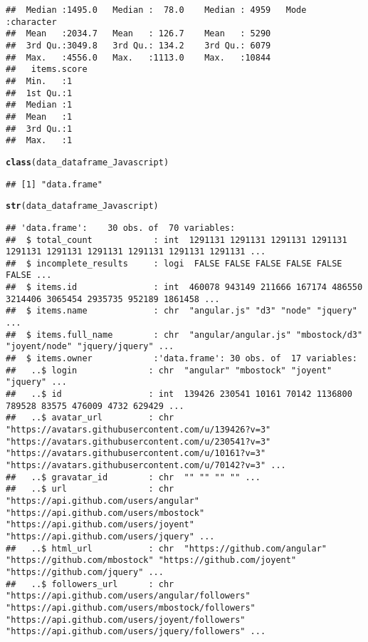\documentclass{article}\usepackage[]{graphicx}\usepackage[]{color}
\makeatletter
\newcommand{\hlstd}[1]{\textcolor[rgb]{0.345,0.345,0.345}{#1}}%
\newcommand{\hlkwd}[1]{\textcolor[rgb]{0.737,0.353,0.396}{\textbf{#1}}}%
\newenvironment{kframe}{%
 \def\at@end@of@kframe{}%
 \ifinner\ifhmode%
  \def\at@end@of@kframe{\end{minipage}}%
  \begin{minipage}{\columnwidth}%
 \fi\fi%
 \def\FrameCommand##1{\hskip\@totalleftmargin \hskip-\fboxsep
 \colorbox{shadecolor}{##1}\hskip-\fboxsep
     \hskip-\linewidth \hskip-\@totalleftmargin \hskip\columnwidth}%
 \MakeFramed {\advance\hsize-\width
   \@totalleftmargin\z@ \linewidth\hsize
   \@setminipage}}%
 {\par\unskip\endMakeFramed%
 \at@end@of@kframe}
\newenvironment{knitrout}{}{} %
\makeatother
\begin{document}
\begin{knitrout}
\begin{kframe}
\begin{verbatim}
##  Median :1495.0   Median :  78.0    Median : 4959   Mode  :character    
##  Mean   :2034.7   Mean   : 126.7    Mean   : 5290                       
##  3rd Qu.:3049.8   3rd Qu.: 134.2    3rd Qu.: 6079                       
##  Max.   :4556.0   Max.   :1113.0    Max.   :10844                       
##   items.score
##  Min.   :1   
##  1st Qu.:1   
##  Median :1   
##  Mean   :1   
##  3rd Qu.:1   
##  Max.   :1
\end{verbatim}
\begin{alltt}
\hlkwd{class}\hlstd{(data_dataframe_Javascript)}
\end{alltt}
\begin{verbatim}
## [1] "data.frame"
\end{verbatim}
\begin{alltt}
\hlkwd{str}\hlstd{(data_dataframe_Javascript)}
\end{alltt}
\begin{verbatim}
## 'data.frame':	30 obs. of  70 variables:
##  $ total_count            : int  1291131 1291131 1291131 1291131 1291131 1291131 1291131 1291131 1291131 1291131 ...
##  $ incomplete_results     : logi  FALSE FALSE FALSE FALSE FALSE FALSE ...
##  $ items.id               : int  460078 943149 211666 167174 486550 3214406 3065454 2935735 952189 1861458 ...
##  $ items.name             : chr  "angular.js" "d3" "node" "jquery" ...
##  $ items.full_name        : chr  "angular/angular.js" "mbostock/d3" "joyent/node" "jquery/jquery" ...
##  $ items.owner            :'data.frame':	30 obs. of  17 variables:
##   ..$ login              : chr  "angular" "mbostock" "joyent" "jquery" ...
##   ..$ id                 : int  139426 230541 10161 70142 1136800 789528 83575 476009 4732 629429 ...
##   ..$ avatar_url         : chr  "https://avatars.githubusercontent.com/u/139426?v=3" "https://avatars.githubusercontent.com/u/230541?v=3" "https://avatars.githubusercontent.com/u/10161?v=3" "https://avatars.githubusercontent.com/u/70142?v=3" ...
##   ..$ gravatar_id        : chr  "" "" "" "" ...
##   ..$ url                : chr  "https://api.github.com/users/angular" "https://api.github.com/users/mbostock" "https://api.github.com/users/joyent" "https://api.github.com/users/jquery" ...
##   ..$ html_url           : chr  "https://github.com/angular" "https://github.com/mbostock" "https://github.com/joyent" "https://github.com/jquery" ...
##   ..$ followers_url      : chr  "https://api.github.com/users/angular/followers" "https://api.github.com/users/mbostock/followers" "https://api.github.com/users/joyent/followers" "https://api.github.com/users/jquery/followers" ...

\end{verbatim}
\end{kframe}
\end{knitrout}
\end{document}
